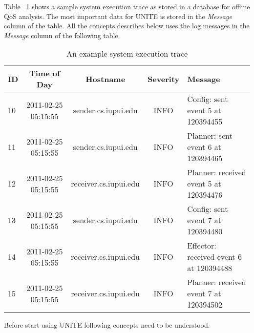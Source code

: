 Table ~\ref{table:execution-trace} shows a sample system execution trace 
as stored in a database for offline QoS analysis. The most important 
data for UNITE is stored in the \textit{Message} column of the table. 
All the concepts describes below uses the log messages in the \textit{Message} 
column of the following table.

\begin{table}[h, captionpos=b]
  \caption{An example system execution trace }
  \label{table:execution-trace}
  \begin{tabular}{lcccl}
  \hline
  \textbf{ID} & \textbf{Time of Day} & \textbf{Hostname} & \textbf{Severity} & \textbf{Message} \\
  \hline
  10 & 2011-02-25 05:15:55 & sender.cs.iupui.edu & INFO & Config: sent event 5 at 120394455 \\
  11 & 2011-02-25 05:15:55 & sender.cs.iupui.edu & INFO & Planner: sent event 6 at 120394465 \\
  12 & 2011-02-25 05:15:55 & receiver.cs.iupui.edu & INFO & Planner: received event 5 at 120394476 \\
  13 & 2011-02-25 05:15:55 & sender.cs.iupui.edu & INFO & Config: sent event 7 at 120394480 \\
  14 & 2011-02-25 05:15:55 & receiver.cs.iupui.edu & INFO & Effector: received event 6 at 120394488 \\
  15 & 2011-02-25 05:15:55 & receiver.cs.iupui.edu & INFO & Planner: received event 7 at 120394502 \\
  \end{tabular}
\end{table}


Before start using UNITE following concepts need to be understood.

